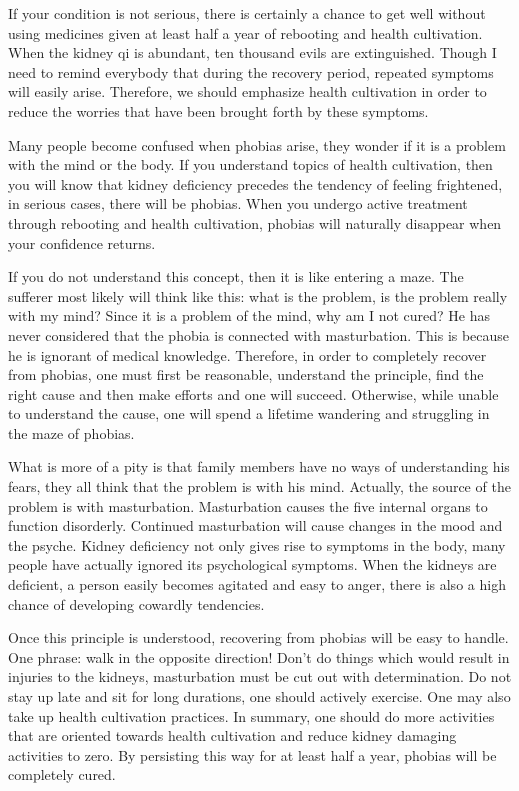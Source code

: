 \documentclass[
]{book}
\begin{document}
If your condition is not serious, there is certainly a chance to get well without using medicines given at least half a year of rebooting and health cultivation. When the kidney qi is abundant, ten thousand evils are extinguished. Though I need to remind everybody that during the recovery period, repeated symptoms will easily arise. Therefore, we should emphasize health cultivation in order to reduce the worries that have been brought forth by these symptoms.

Many people become confused when phobias arise, they wonder if it is a problem with the mind or the body. If you understand topics of health cultivation, then you will know that kidney deficiency precedes the tendency of feeling frightened, in serious cases, there will be phobias. When you undergo active treatment through rebooting and health cultivation, phobias will naturally disappear when your confidence returns.

If you do not understand this concept, then it is like entering a maze. The sufferer most likely will think like this: what is the problem, is the problem really with my mind? Since it is a problem of the mind, why am I not cured? He has never considered that the phobia is connected with masturbation. This is because he is ignorant of medical knowledge. Therefore, in order to completely recover from phobias, one must first be reasonable, understand the principle, find the right cause and then make efforts and one will succeed. Otherwise, while unable to understand the cause, one will spend a lifetime wandering and struggling in the maze of phobias.

What is more of a pity is that family members have no ways of understanding his fears, they all think that the problem is with his mind. Actually, the source of the problem is with masturbation. Masturbation causes the five internal organs to function disorderly. Continued masturbation will cause changes in the mood and the psyche. Kidney deficiency not only gives rise to symptoms in the body, many people have actually ignored its psychological symptoms. When the kidneys are deficient, a person easily becomes agitated and easy to anger, there is also a high chance of developing cowardly tendencies.

Once this principle is understood, recovering from phobias will be easy to handle. One phrase: walk in the opposite direction! Don't do things which would result in injuries to the kidneys, masturbation must be cut out with determination. Do not stay up late and sit for long durations, one should actively exercise. One may also take up health cultivation practices. In summary, one should do more activities that are oriented towards health cultivation and reduce kidney damaging activities to zero. By persisting this way for at least half a year, phobias will be completely cured.
\end{document}
